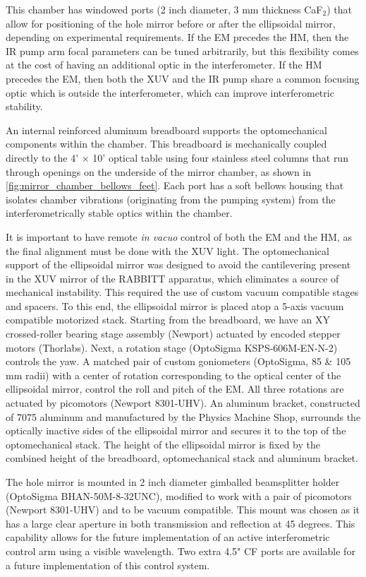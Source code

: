 This chamber has windowed ports (2 inch diameter, 3 mm thickness CaF$_2$) that allow for positioning of the hole mirror before or after the ellipsoidal mirror, depending on experimental requirements. If the EM precedes the HM, then the IR pump arm focal parameters can be tuned arbitrarily, but this flexibility comes at the cost of having an additional optic in the interferometer. If the HM precedes the EM, then both the XUV and the IR pump share a common focusing optic which is outside the interferometer, which can improve interferometric stability.

An internal reinforced aluminum breadboard supports the optomechanical components within the chamber. This breadboard is mechanically coupled directly to the 4' $\times$ 10' optical table using four stainless steel columns that run through openings on the underside of the mirror chamber, as shown in \cref{fig:mirror_chamber_bellows_feet}. Each port has a soft bellows housing that isolates chamber vibrations (originating from the pumping system) from the interferometrically stable optics within the chamber. 

It is important to have remote \textit{in vacuo} control of both the EM and the HM, as the final alignment must be done with the XUV light. The optomechanical support of the ellipsoidal mirror was designed to avoid the cantilevering present in the XUV mirror of the RABBITT apparatus, which eliminates a source of mechanical instability. This required the use of custom vacuum compatible stages and spacers. To this end, the ellipsoidal mirror is placed atop a 5-axis vacuum compatible motorized stack. Starting from the breadboard, we have an XY crossed-roller bearing stage assembly (Newport) actuated by encoded stepper motors (Thorlabs). Next, a rotation stage (OptoSigma KSPS-606M-EN-N-2) controls the yaw. A matched pair of custom goniometers (OptoSigma, 85 \& 105 mm radii) with a center of rotation corresponding to the optical center of the ellipsoidal mirror, control the roll and pitch of the EM. All three rotations are actuated by picomotors (Newport 8301-UHV). An aluminum bracket, constructed of 7075 aluminum and manufactured by the Physics Machine Shop, surrounds the optically inactive sides of the ellipsoidal mirror and secures it to the top of the optomechanical stack. The height of the ellipsoidal mirror is fixed by the combined height of the breadboard, optomechanical stack and aluminum bracket.

The hole mirror is mounted in 2 inch diameter gimballed beamsplitter holder (OptoSigma BHAN-50M-8-32UNC), modified to work with a pair of picomotors (Newport 8301-UHV) and to be vacuum compatible. This mount was chosen as it has a large clear aperture in both transmission and reflection at 45 degrees. This capability allows for the future implementation of an active interferometric control arm using a visible wavelength. Two extra 4.5" CF ports are available for a future implementation of this control system.


